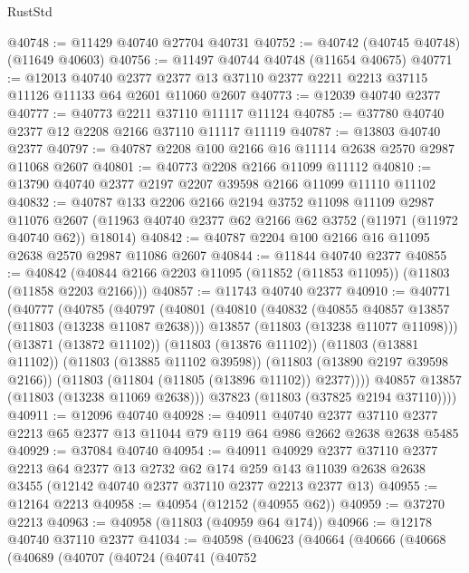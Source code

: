 \begin{lexlean}{RustStd}
\begin{coremodule}
@40748 := @11429 @40740 @27704 @40731
@40752 := @40742 (@40745 @40748) (@11649 @40603)
@40756 := @11497 @40744 @40748 (@11654 @40675)
@40771 := @12013
    @40740
    @2377
    @2377
    @13
    @37110
    @2377
    @2211
    @2213
    @37115
    @11126
    @11133
    @64
    @2601
    @11060
    @2607
@40773 := @12039 @40740 @2377
@40777 := @40773 @2211 @37110 @11117 @11124
@40785 := @37780 @40740 @2377 @12 @2208 @2166 @37110 @11117 @11119
@40787 := @13803 @40740 @2377
@40797 := @40787 @2208 @100 @2166 @16 @11114 @2638 @2570 @2987 @11068 @2607
@40801 := @40773 @2208 @2166 @11099 @11112
@40810 := @13790 @40740 @2377 @2197 @2207 @39598 @2166 @11099 @11110 @11102
@40832 := @40787
    @133
    @2206
    @2166
    @2194
    @3752
    @11098
    @11109
    @2987
    @11076
    @2607
    (@11963 @40740 @2377 @62 @2166 @62 @3752 (@11971 (@11972 @40740 @62)) @18014)
@40842 := @40787 @2204 @100 @2166 @16 @11095 @2638 @2570 @2987 @11086 @2607
@40844 := @11844 @40740 @2377
@40855 := @40842 (@40844 @2166 @2203 @11095 (@11852 (@11853 @11095)) (@11803 (@11858 @2203 @2166)))
@40857 := @11743 @40740 @2377
@40910 := @40771
    (@40777
      (@40785
        (@40797
          (@40801
            (@40810
              (@40832
                (@40855 @40857 @13857 (@11803 (@13238 @11087 @2638)))
                @13857
                (@11803 (@13238 @11077 @11098)))
              (@13871 (@13872 @11102))
              (@11803 (@13876 @11102))
              (@11803 (@13881 @11102))
              (@11803 (@13885 @11102 @39598))
              (@11803 (@13890 @2197 @39598 @2166))
              (@11803 (@11804 (@11805 (@13896 @11102)) @2377))))
          @40857
          @13857
          (@11803 (@13238 @11069 @2638)))
        @37823
        (@11803 (@37825 @2194 @37110))))
@40911 := @12096 @40740
@40928 := @40911
    @40740
    @2377
    @37110
    @2377
    @2213
    @65
    @2377
    @13
    @11044
    @79
    @119
    @64
    @986
    @2662
    @2638
    @2638
    @5485
@40929 := @37084 @40740
@40954 := @40911
    @40929
    @2377
    @37110
    @2377
    @2213
    @64
    @2377
    @13
    @2732
    @62
    @174
    @259
    @143
    @11039
    @2638
    @2638
    @3455
    (@12142 @40740 @2377 @37110 @2377 @2213 @2377 @13)
@40955 := @12164 @2213
@40958 := @40954 (@12152 (@40955 @62))
@40959 := @37270 @2213
@40963 := @40958 (@11803 (@40959 @64 @174))
@40966 := @12178 @40740 @37110 @2377
@41034 := @40598
    (@40623
      (@40664
        (@40666
          (@40668
            (@40689
              (@40707
                (@40724
                  (@40741
                    (@40752

\end{coremodule}
\end{lexlean}

